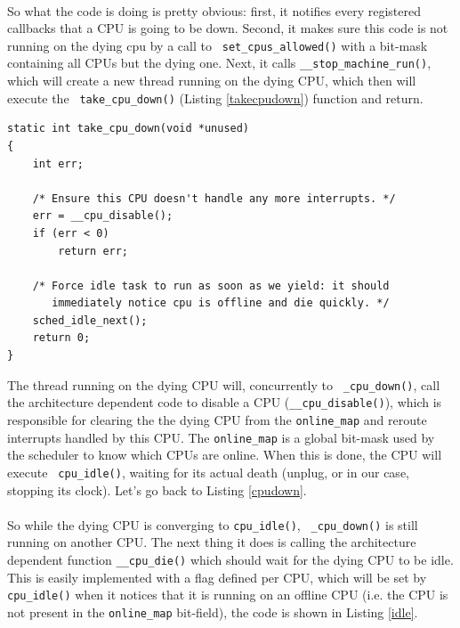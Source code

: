 \documentclass{report}
\renewcommand{\tt}[1]{\texttt{{{#1}}}}
\begin{document}
\paragraph{}
So what the code is doing is pretty obvious: first, it notifies every
registered callbacks that a CPU is going to be down. Second, it makes sure this
code is not running on the dying cpu by a call to \tt{ set\_cpus\_allowed()}
with a bit-mask containing all CPUs but the dying one. Next, it calls
\tt{\_\_stop\_machine\_run()}, which will create a new thread running on the
dying CPU, which then will execute the \tt{ take\_cpu\_down()} (Listing
\ref{takecpudown}) function and return.

\begin{lstlisting}[caption=\tt{take\_cpu\_down()}{{,}} \tt{kernel/cpu.c},label=takecpudown]
static int take_cpu_down(void *unused)
{
	int err;

	/* Ensure this CPU doesn't handle any more interrupts. */
	err = __cpu_disable();
	if (err < 0)
		return err;

	/* Force idle task to run as soon as we yield: it should
	   immediately notice cpu is offline and die quickly. */
	sched_idle_next();
	return 0;
}
\end{lstlisting}

The thread running on the dying CPU will, concurrently to \tt{ \_cpu\_down()},
call the architecture dependent code to disable a CPU
(\tt{\_\_cpu\_disable()}), which is responsible for clearing the the dying CPU
from the \tt{online\_map} and reroute interrupts handled by this CPU. The
\tt{online\_map} is a global bit-mask used by the scheduler to know which CPUs
are online. When this is done, the CPU will execute \tt{ cpu\_idle()}, waiting
for its actual death (unplug, or in our case, stopping its clock). Let's go
back to Listing \ref{cpudown}.

\paragraph{}
So while the dying CPU is converging to \tt{cpu\_idle()}, \tt{ \_cpu\_down()}
is still running on another CPU. The next thing it does is calling the
architecture dependent function \tt{\_\_cpu\_die()} which should wait for the
dying CPU to be idle. This is easily implemented with a flag defined per CPU,
which will be set by \tt{cpu\_idle()} when it notices that it is running on an
offline CPU (i.e. the CPU is not present in the \tt{online\_map} bit-field),
the code is shown in Listing \ref{idle}.
\end{document}
